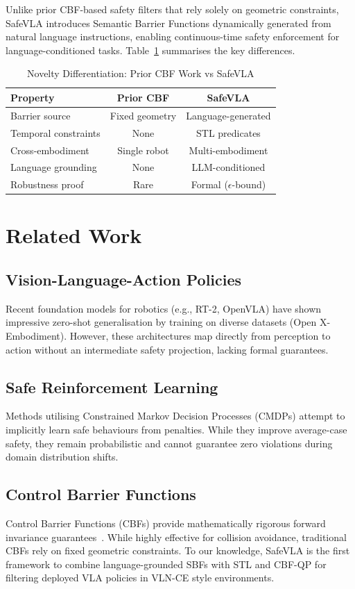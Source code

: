 \documentclass[conference]{IEEEtran}
\begin{document}
Unlike prior CBF-based safety filters that rely solely on geometric constraints, SafeVLA introduces Semantic Barrier Functions dynamically generated from natural language instructions, enabling continuous-time safety enforcement for language-conditioned tasks. Table~\ref{tab:novelty} summarises the key differences.

\begin{table}[h]
\centering
\caption{Novelty Differentiation: Prior CBF Work vs SafeVLA}
\label{tab:novelty}
\begin{tabular}{lcc}
\toprule
\textbf{Property} & \textbf{Prior CBF} & \textbf{SafeVLA} \\
\midrule
Barrier source & Fixed geometry & Language-generated \\
Temporal constraints & None & STL predicates \\
Cross-embodiment & Single robot & Multi-embodiment \\
Language grounding & None & LLM-conditioned \\
Robustness proof & Rare & Formal ($\epsilon$-bound) \\
\bottomrule
\end{tabular}
\end{table}

\section{Related Work}
\subsection{Vision-Language-Action Policies}
Recent foundation models for robotics (e.g., RT-2, OpenVLA) have shown impressive zero-shot generalisation by training on diverse datasets (Open X-Embodiment). However, these architectures map directly from perception to action without an intermediate safety projection, lacking formal guarantees.
\subsection{Safe Reinforcement Learning}
Methods utilising Constrained Markov Decision Processes (CMDPs) attempt to implicitly learn safe behaviours from penalties. While they improve average-case safety, they remain probabilistic and cannot guarantee zero violations during domain distribution shifts.
\subsection{Control Barrier Functions}
Control Barrier Functions (CBFs) provide mathematically rigorous forward invariance guarantees~\cite{ames2017cbf, ames2019cbf_tutorial, panja2024cbf_survey}. While highly effective for collision avoidance, traditional CBFs rely on fixed geometric constraints. To our knowledge, SafeVLA is the first framework to combine language-grounded SBFs with STL and CBF-QP for filtering deployed VLA policies in VLN-CE style environments.
\end{document}
